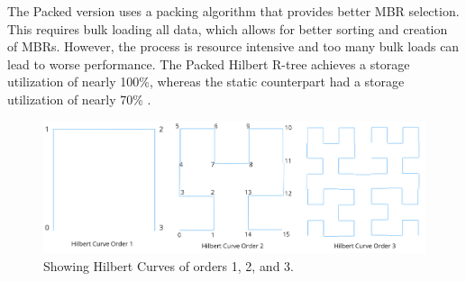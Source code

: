 The Packed version uses a packing algorithm that provides better MBR selection. This requires bulk loading all data, which allows for better sorting and creation of MBRs. However, the process is resource intensive and too many bulk loads can lead to worse performance. The Packed Hilbert R-tree achieves a storage utilization of nearly 100\%, whereas the static counterpart had a storage utilization of nearly 70\% \cite{rtree}.

\begin{figure}[t]
    \centering
    \includegraphics[width=\linewidth]{./figures/hilbert_orders.png}
    \caption{Showing Hilbert Curves of orders 1, 2, and 3.}
    \label{fig:hilbert}
\end{figure}

